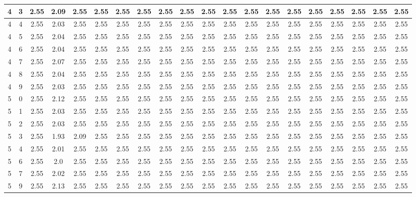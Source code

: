 \begin{landscape}
\begin{longtable}{|c|c||c||c|c|c|c|c|c|c|c||c|c|c|c|c|c|c|c|c|}
	4 & 3 & 2.55 & 2.09 & 2.55 & 2.55 & 2.55 & 2.55 & 2.55 & 2.55 & 2.55 & 2.55 & 2.55 & 2.55 & 2.55 & 2.55 & 2.55 & 2.55 & 2.55 & 2.55 \\ \hline
	4 & 4 & 2.55 & 2.03 & 2.55 & 2.55 & 2.55 & 2.55 & 2.55 & 2.55 & 2.55 & 2.55 & 2.55 & 2.55 & 2.55 & 2.55 & 2.55 & 2.55 & 2.55 & 2.55 \\ \hline
	4 & 5 & 2.55 & 2.04 & 2.55 & 2.55 & 2.55 & 2.55 & 2.55 & 2.55 & 2.55 & 2.55 & 2.55 & 2.55 & 2.55 & 2.55 & 2.55 & 2.55 & 2.55 & 2.55 \\ \hline
	4 & 6 & 2.55 & 2.04 & 2.55 & 2.55 & 2.55 & 2.55 & 2.55 & 2.55 & 2.55 & 2.55 & 2.55 & 2.55 & 2.55 & 2.55 & 2.55 & 2.55 & 2.55 & 2.55 \\ \hline
	4 & 7 & 2.55 & 2.07 & 2.55 & 2.55 & 2.55 & 2.55 & 2.55 & 2.55 & 2.55 & 2.55 & 2.55 & 2.55 & 2.55 & 2.55 & 2.55 & 2.55 & 2.55 & 2.55 \\ \hline
	4 & 8 & 2.55 & 2.04 & 2.55 & 2.55 & 2.55 & 2.55 & 2.55 & 2.55 & 2.55 & 2.55 & 2.55 & 2.55 & 2.55 & 2.55 & 2.55 & 2.55 & 2.55 & 2.55 \\ \hline
	4 & 9 & 2.55 & 2.03 & 2.55 & 2.55 & 2.55 & 2.55 & 2.55 & 2.55 & 2.55 & 2.55 & 2.55 & 2.55 & 2.55 & 2.55 & 2.55 & 2.55 & 2.55 & 2.55 \\ \hline
	5 & 0 & 2.55 & 2.12 & 2.55 & 2.55 & 2.55 & 2.55 & 2.55 & 2.55 & 2.55 & 2.55 & 2.55 & 2.55 & 2.55 & 2.55 & 2.55 & 2.55 & 2.55 & 2.55 \\ \hline
	5 & 1 & 2.55 & 2.03 & 2.55 & 2.55 & 2.55 & 2.55 & 2.55 & 2.55 & 2.55 & 2.55 & 2.55 & 2.55 & 2.55 & 2.55 & 2.55 & 2.55 & 2.55 & 2.55 \\ \hline
	5 & 2 & 2.55 & 2.03 & 2.55 & 2.55 & 2.55 & 2.55 & 2.55 & 2.55 & 2.55 & 2.55 & 2.55 & 2.55 & 2.55 & 2.55 & 2.55 & 2.55 & 2.55 & 2.55 \\ \hline
	5 & 3 & 2.55 & 1.93 & 2.09 & 2.55 & 2.55 & 2.55 & 2.55 & 2.55 & 2.55 & 2.55 & 2.55 & 2.55 & 2.55 & 2.55 & 2.55 & 2.55 & 2.55 & 2.55 \\ \hline
	5 & 4 & 2.55 & 2.01 & 2.55 & 2.55 & 2.55 & 2.55 & 2.55 & 2.55 & 2.55 & 2.55 & 2.55 & 2.55 & 2.55 & 2.55 & 2.55 & 2.55 & 2.55 & 2.55 \\ \hline
	5 & 6 & 2.55 & 2.0 & 2.55 & 2.55 & 2.55 & 2.55 & 2.55 & 2.55 & 2.55 & 2.55 & 2.55 & 2.55 & 2.55 & 2.55 & 2.55 & 2.55 & 2.55 & 2.55 \\ \hline
	5 & 7 & 2.55 & 2.02 & 2.55 & 2.55 & 2.55 & 2.55 & 2.55 & 2.55 & 2.55 & 2.55 & 2.55 & 2.55 & 2.55 & 2.55 & 2.55 & 2.55 & 2.55 & 2.55 \\ \hline
	5 & 9 & 2.55 & 2.13 & 2.55 & 2.55 & 2.55 & 2.55 & 2.55 & 2.55 & 2.55 & 2.55 & 2.55 & 2.55 & 2.55 & 2.55 & 2.55 & 2.55 & 2.55 & 2.55 \\ \hline

\end{longtable}
\end{landscape}
